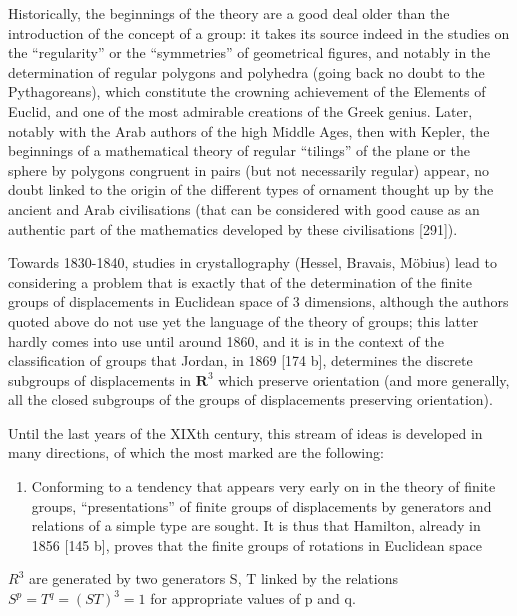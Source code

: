 Historically, the beginnings of the theory are a good deal older than the introduction of the concept of a group: it takes its source indeed in the studies on the ``regularity'' or the ``symmetries'' of geometrical figures, and notably in the determination of regular polygons and polyhedra (going back no doubt to the Pythagoreans), which constitute the crowning achievement of the Elements of Euclid, and one of the most admirable creations of the Greek genius. Later, notably with the Arab authors of the high Middle Ages, then with Kepler, the beginnings of a mathematical theory of regular ``tilings'' of the plane or the sphere by polygons congruent in pairs (but not necessarily regular) appear, no doubt linked to the origin of the different types of ornament thought up by the ancient and Arab civilisations (that can be considered with good cause as an authentic part of the mathematics developed by these civilisations {[}291{]}).

Towards 1830-1840, studies in crystallography (Hessel, Bravais, Möbius) lead to considering a problem that is exactly that of the determination of the finite groups of displacements in Euclidean space of 3 dimensions, although the authors quoted above do not use yet the language of the theory of groups; this latter hardly comes into use until around 1860, and it is in the context of the classification of groups that Jordan, in 1869 {[}174 b{]}, determines the discrete subgroups of displacements in \(\mathbf{R}^3\) which preserve orientation (and more generally, all the closed subgroups of the groups of displacements preserving orientation).

Until the last years of the XIXth century, this stream of ideas is developed in many directions, of which the most marked are the following:

\begin{enumerate}
\def\labelenumi{\arabic{enumi}.}
\tightlist
\item
  Conforming to a tendency that appears very early on in the theory of finite groups, ``presentations'' of finite groups of displacements by generators and relations of a simple type are sought. It is thus that Hamilton, already in 1856 {[}145 b{]}, proves that the finite groups of rotations in Euclidean space
\end{enumerate}

\(R^{3}\) are generated by two generators S, T linked by the relations \(S^{p} = T^{q} = (ST)^{3} = 1\) for appropriate values of p and q.

